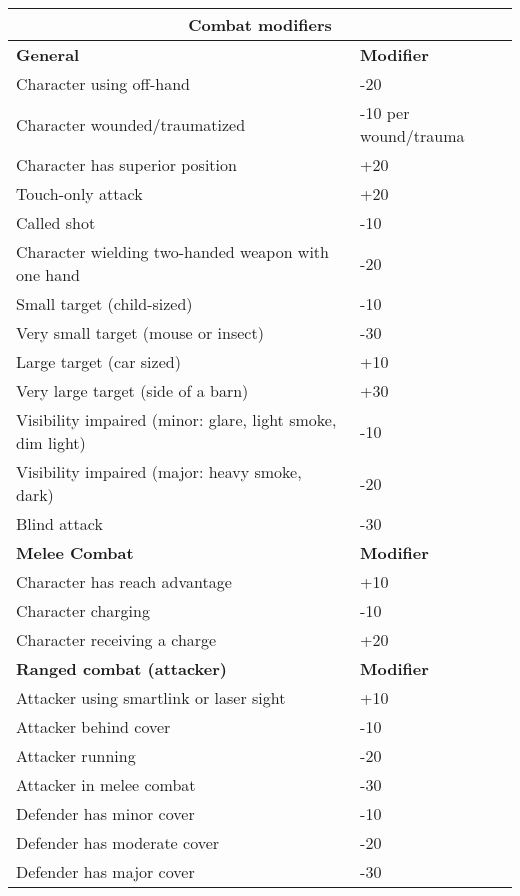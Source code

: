 \begin{table} \begin{tabular}{|l|l|} %
\hline \multicolumn{2}{|c|}{\textbf{Combat modifiers}} \\
\hline \textbf{General} 					& \textbf{Modifier} \\ 
\hline Character using off-hand				& -20 \\
\hline Character wounded/traumatized			& -10 per wound/trauma \\
\hline Character has superior position		& +20 \\
\hline Touch-only attack					& +20 \\
\hline Called shot						& -10 \\
\hline Character wielding two-handed weapon with one hand & -20 \\
\hline Small target (child-sized)			& -10 \\
\hline Very small target (mouse or insect)	& -30 \\
\hline Large target (car sized) 			& +10 \\
\hline Very large target (side of a barn) 	& +30 \\
\hline Visibility impaired (minor: glare, light smoke, dim light) & -10 \\
\hline Visibility impaired (major: heavy smoke, dark) & -20 \\
\hline Blind attack 						& -30 \\
\hline \textbf{Melee Combat} 				& \textbf{Modifier} \\
\hline Character has reach advantage 		& +10 \\
\hline Character charging 					& -10 \\
\hline Character receiving a charge 			& +20 \\
\hline \textbf{Ranged combat (attacker)} 		& \textbf{Modifier} \\
\hline Attacker using smartlink or laser sight	& +10 \\
\hline Attacker behind cover 				& -10 \\
\hline Attacker running 					& -20 \\
\hline Attacker in melee combat 			& -30 \\
\hline Defender has minor cover 			& -10 \\
\hline Defender has moderate cover 			& -20 \\
\hline Defender has major cover 			& -30 \\

\end{tabular}
\end{table}
